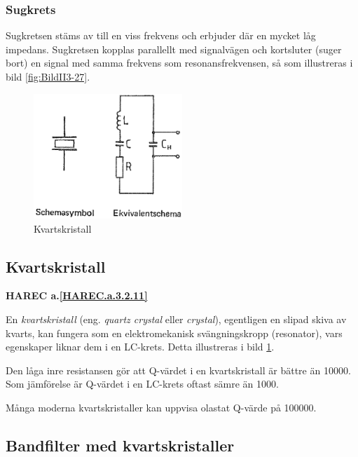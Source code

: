 \subsubsection{Sugkrets}
Sugkretsen stäms av till en viss frekvens och erbjuder där en mycket låg
impedans.
Sugkretsen kopplas parallellt med signalvägen och kortsluter (suger bort) en
signal med samma frekvens som resonansfrekvensen, så som illustreras i bild
\ref{fig:BildII3-27}.

\begin{figure}
\includegraphics[width=0.5\textwidth]{images/cropped_pdfs/bild_2_3-28.pdf}
\caption{Kvartskristall}
\label{fig:BildII3-28}
\end{figure}

\subsection{Kvartskristall}

\textbf{HAREC a.\ref{HAREC.a.3.2.11}\label{myHAREC.a.3.2.11}}

En \emph{kvartskristall} (eng. \emph{quartz crystal} eller \emph{crystal}),
egentligen en slipad skiva av kvarts, kan fungera som en
elektromekanisk svängningskropp (resonator), vars egenskaper liknar dem i en
LC-krets.
Detta illustreras i bild \ref{fig:BildII3-28}.

Den låga inre resistansen gör att Q-värdet i en kvartskristall är bättre än
10000.
Som jämförelse är Q-värdet i en LC-krets oftast sämre än 1000.

Många moderna kvartskristaller kan uppvisa olastat Q-värde på 100000.

\vspace{12pt} %

\subsection{Bandfilter med kvartskristaller}

